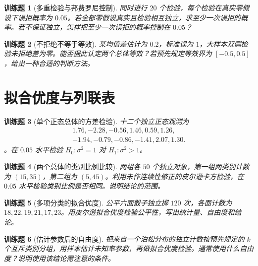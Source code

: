 \documentclass[UTF8,12pt,a4paper,fontset=fandol]{ctexbook}
\newtheorem{exercise}{训练题}[section]
\begin{document}
\begin{exercise}[多重检验与邦费罗尼控制]\label{q:B14.3}
同时进行 $20$ 个检验，每个检验在真实零假设下误拒概率为 $0.05$。若全部零假设真实且检验相互独立，求至少一次误拒的概率。若不保证独立，怎样把至少一次误拒的概率控制在 $0.05$？\par{}\end{exercise}

\begin{exercise}[不拒绝不等于等效]\label{q:B14.4}
某均值差估计为 $0.2$，标准误为 $1$，大样本双侧检验未拒绝差为零。能否据此认定两个总体等效？若预先规定等效界为 $[-0.5,0.5]$，给出一种合适的判断方法。\par{}\end{exercise}

\clearpage\section{拟合优度与列联表}

\begin{exercise}[单个正态总体的方差检验]\label{q:M-P9-3}
十二个独立正态观测为 \[\begin{gathered}1.76,-2.28,-0.56,1.46,0.59,1.26,\\-1.94,-0.79,-0.86,-1.41,2.07,1.30.\end{gathered}\]。在 $0.05$ 水平检验 $H_0:\sigma^2=1$ 对 $H_1:\sigma^2>1$。\par{}\end{exercise}

\begin{exercise}[两个总体的类别比例比较]\label{q:M-E2-II5}
两组各 $50$ 个独立对象，第一组两类别计数为 $(15,35)$，第二组为 $(5,45)$。利用未作连续性修正的皮尔逊卡方检验，在 $0.05$ 水平检验类别比例是否相同。说明结论的范围。\par{}\end{exercise}

\begin{exercise}[多项分类的拟合优度]\label{q:B15.1}
公平六面骰子独立掷 $120$ 次，各面计数为 $18,22,19,21,17,23$。用皮尔逊拟合优度检验公平性，写出统计量、自由度和结论。\par{}\end{exercise}

\begin{exercise}[估计参数后的自由度]\label{q:B15.2}
把来自一个泊松分布的独立计数按预先规定的 $k$ 个互斥类别分组，用样本估计未知率参数，再做拟合优度检验。通常使用什么自由度？说明使用该结论需注意的条件。\par{}\end{exercise}
\end{document}

